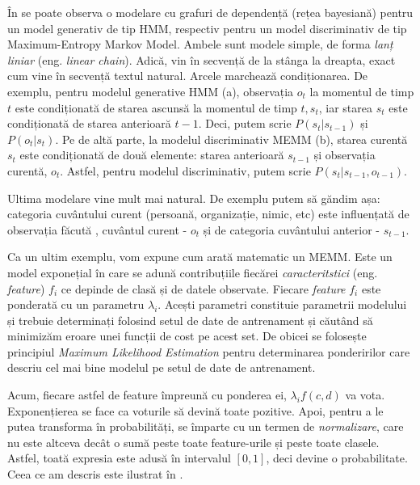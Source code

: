 
În  se poate observa o modelare cu grafuri de dependență (rețea bayesiană) pentru un model generativ de tip HMM, respectiv pentru un model discriminativ de tip Maximum-Entropy Markov Model. Ambele sunt modele simple, de forma \textit{lanț liniar} (eng. \textit{linear chain}). Adică, vin în secvență de la stânga la dreapta, exact cum vine în secvență textul natural. Arcele marchează condiționarea. De exemplu, pentru modelul generative HMM (a), observația $o_t$ la momentul de timp $t$ este condiționată de starea ascunsă la momentul de timp $t, s_t$, iar starea $s_t$ este condiționată de starea anterioară $t-1$. Deci, putem scrie $P(s_t|s_{t-1})$ și $P(o_t|s_t)$. Pe de altă parte, la modelul discriminativ MEMM (b), starea curentă $s_t$ este condiționată de două elemente: starea anterioară $s_{t - 1}$ și observația curentă,  $o_t$. Astfel, pentru modelul discriminativ, putem scrie $P(s_t|s_{t - 1}, o_{t - 1})$.

Ultima modelare vine mult mai natural. De exemplu putem să găndim așa: categoria cuvântului curent (persoană, organizație, nimic, etc) este influențată de observația făcută , cuvântul curent - $o_t$ și de categoria cuvântului anterior - $s_{t-1}$.


Ca un ultim exemplu, vom expune cum arată matematic un MEMM. Este un model exponețial în care se adună contribuțiile fiecărei \textit{caracteritstici} (eng. \textit{feature}) $f_i$ ce depinde de clasă și de datele observate. Fiecare \textit{feature} $f_i$ este ponderată cu un parametru $\lambda_{i}$. Acești parametri constituie parametrii modelului și trebuie determinați folosind setul de date de antrenament și căutând să minimizăm eroare unei funcții de cost pe acest set. De obicei se folosește principiul \textit{Maximum Likelihood Estimation} pentru determinarea ponderirilor care descriu cel mai bine modelul pe setul de date de antrenament.

Acum, fiecare astfel de feature împreună cu ponderea ei, $\lambda_{i} f(c,d) $ va vota. Exponențierea se face ca voturile să devină toate pozitive. Apoi, pentru a le putea transforma în probabilități, se împarte cu un termen de \textit{normalizare}, care nu este altceva decât o sumă peste toate feature-urile și peste toate clasele. Astfel, toată expresia este adusă în intervalul $[0,1]$, deci devine o probabilitate. Ceea ce am descris este ilustrat în .


